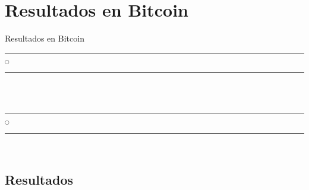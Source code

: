 \chapter[Resultados]{Resultados en Bitcoin}{Resultados en Bitcoin}\label{Intro}

\noindent
\rule{0.49\textwidth}{0.75pt} $_{\bigcirc}$ \rule{0.49\textwidth}{0.75pt}\\
\lipsum[1]
\lipsum[2]\\
\noindent
\rule{0.49\textwidth}{0.75pt} $_{\bigcirc}$ \rule{0.49\textwidth}{0.75pt}\\
\clearpage

\section{Resultados}
\label{subResultados}
\lipsum


